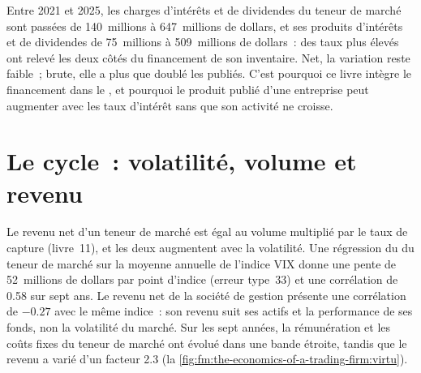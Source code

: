 \begin{remark}\label{rem:fm:the-economics-of-a-trading-firm:financing}
Entre 2021 et 2025, les charges d'intérêts et de dividendes du teneur de marché sont passées de 140~millions à 647~millions de dollars, et ses produits
d'intérêts et de dividendes de 75~millions à 509~millions de dollars~: des taux plus élevés ont relevé les deux côtés du financement de son inventaire. Net, la variation reste faible~; brute, elle
a plus que doublé les  publiés. C'est pourquoi ce livre intègre le financement dans le , et pourquoi le produit publié
d'une entreprise peut augmenter avec les taux d'intérêt sans que son activité ne croisse.
\end{remark}

\section{Le cycle~: volatilité, volume et revenu}

Le revenu net d'un teneur de marché est égal au volume multiplié par le taux de capture (livre~11), et les deux augmentent avec la volatilité. Une régression du 
du teneur de marché sur la moyenne annuelle de l'indice VIX donne une pente de 52~millions de dollars par point d'indice (erreur type~33) et une corrélation de 0.58 sur sept
ans. Le revenu net de la société de gestion présente une corrélation de $-0.27$ avec le même indice~: son revenu suit ses actifs et la performance de ses fonds,
non la volatilité du marché. Sur les sept années, la rémunération et les coûts fixes du teneur de marché ont évolué dans une bande étroite, tandis que le revenu
a varié d'un facteur 2.3 (la \cref{fig:fm:the-economics-of-a-trading-firm:virtu}).

